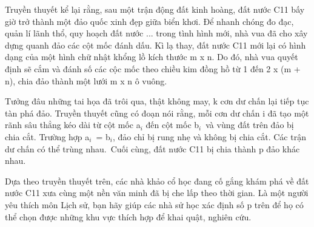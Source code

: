 Truyền thuyết kể lại rằng, sau một trận động đất kinh hoàng, đất nước C11 bấy giờ trở thành một đảo quốc xinh đẹp giữa biển khơi. Để nhanh chóng đo đạc, quản lí lãnh thổ, quy hoạch đất nước ... trong tình hình mới, nhà vua đã cho xây dựng quanh đảo các cột mốc đánh dấu. Kì lạ thay, đất nước C11 mới lại có hình dạng của một hình chữ nhật khổng lồ kích thước m x n. Do đó, nhà vua quyết định sẽ cắm và đánh số các cộc mốc theo chiều kim đồng hồ từ 1 đến 2 x (m + n), chia đảo thành một lưới m x n ô vuông.

Tưởng đâu những tai họa đã trôi qua, thật không may, k cơn dư chấn lại tiếp tục tàn phá đảo. Truyền thuyết cũng có đoạn nói rằng, mỗi cơn dư chấn i đã tạo một rãnh sâu thẳng kéo dài từ cột mốc a$_i$ đến cột mốc b$_i$ và vùng đất trên đảo bị chia cắt. Trường hợp a$_i$ = b$_i$, đảo chỉ bị rung nhẹ và không bị chia cắt. Các trận dư chấn có thể trùng nhau. Cuối cùng, đất nước C11 bị chia thành p đảo khác nhau.

Dựa theo truyền thuyết trên, các nhà khảo cổ học đang cố gắng khám phá về đất nước C11 xưa cùng một nền văn minh đã bị che lấp theo thời gian. Là một người yêu thích môn Lịch sử, bạn hãy giúp các nhà sử học xác định số p trên để họ có thể chọn được những khu vực thích hợp để khai quật, nghiên cứu.